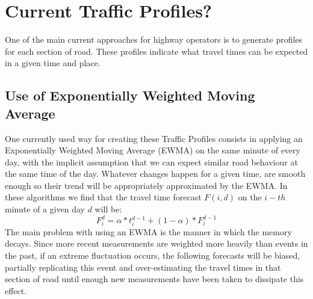 \documentclass[conference]{IEEEtran}
\begin{document}
\section{Current Traffic Profiles?}
One of the main current approaches for highway operators is to generate profiles for each section of road. These profiles indicate what travel times can be expected in a given time and place.

\subsection{Use of Exponentially Weighted Moving Average} \label{ewma}
One currently used way for creating these Traffic Profiles consists in applying an Exponentially Weighted Moving Average (EWMA) on the same minute of every day, with the implicit assumption that we can expect similar road behaviour at the same time of the day. Whatever changes happen for a given time, are smooth enough so their trend will be appropriately approximated by the EWMA.
In these algorithms we find that the travel time forecast $F(i,d)$ on the $i-th$ minute of a given day $d$ will be:
\begin{equation}
F^{d}_i = \alpha * t^{d-1}_{i} + (1-\alpha)*F^{d-1}_{i}
\end{equation}
The main problem with using an EWMA is the manner in which the memory decays. Since more recent measurements are weighted more heavily than events in the past, if an extreme fluctuation occurs, the following forecasts will be biased, partially replicating this event and over-estimating the travel times in that section of road until enough new measurements have been taken to dissipate this effect.
\end{document}
